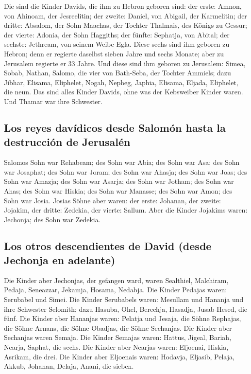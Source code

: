  Die sind die Kinder Davids, die ihm zu Hebron geboren
sind: der erste: Amnon, von Ahinoam, der Jesreelitin; der zweite:
Daniel, von Abigail, der Karmelitin;  der dritte: Absalom,
der Sohn Maachas, der Tochter Thalmais, des Königs zu Gessur; der
vierte: Adonia, der Sohn Haggiths;  der fünfte: Sephatja,
von Abital; der sechste: Jethream, von seinem Weibe Egla. 
Diese sechs sind ihm geboren zu Hebron; denn er regierte daselbst sieben
Jahre und sechs Monate; aber zu Jerusalem regierte er 33 Jahre.
 Und diese sind ihm geboren zu Jerusalem: Simea, Sobab,
Nathan, Salomo, die vier von Bath-Seba, der Tochter Ammiels;
 dazu Jibhar, Elisama, Eliphelet,  Nogah,
Nepheg, Japhia,  Elisama, Eljada, Eliphelet, die neun.
 Das sind alles Kinder Davids, ohne was der Kebsweiber
Kinder waren. Und Thamar war ihre Schwester.

\hypertarget{los-reyes-davuxeddicos-desde-salomuxf3n-hasta-la-destrucciuxf3n-de-jerusaluxe9n}{%
\subsection{Los reyes davídicos desde Salomón hasta la destrucción de
Jerusalén}\label{los-reyes-davuxeddicos-desde-salomuxf3n-hasta-la-destrucciuxf3n-de-jerusaluxe9n}}

 Salomos Sohn war Rehabeam; des Sohn war Abia; des Sohn
war Asa; des Sohn war Josaphat;  des Sohn war Joram; des
Sohn war Ahasja; des Sohn war Joas;  des Sohn war Amazja;
des Sohn war Asarja; des Sohn war Jotham;  des Sohn war
Ahas; des Sohn war Hiskia; des Sohn war Manasse;  des
Sohn war Amon; des Sohn war Josia.  Josias Söhne aber
waren: der erste: Johanan, der zweite: Jojakim, der dritte: Zedekia, der
vierte: Sallum.  Aber die Kinder Jojakims waren:
Jechonja; des Sohn war Zedekia.

\hypertarget{los-otros-descendientes-de-david-desde-jechonja-en-adelante}{%
\subsection{Los otros descendientes de David (desde Jechonja en
adelante)}\label{los-otros-descendientes-de-david-desde-jechonja-en-adelante}}

 Die Kinder aber Jechonjas, der gefangen ward, waren
Sealthiel,  Malchiram, Pedaja, Seneazzar, Jekamja,
Hosama, Nedabja.  Die Kinder Pedajas waren: Serubabel und
Simei. Die Kinder Serubabels waren: Mesullam und Hananja und ihre
Schwester Selomith;  dazu Hasuba, Ohel, Berechja,
Hasadja, Jusab-Hesed, die fünf.  Die Kinder aber Hananjas
waren: Pelatja und Jesaja, die Söhne Rephajas, die Söhne Arnans, die
Söhne Obadjas, die Söhne Sechanjas.  Die Kinder aber
Sechanjas waren Semaja. Die Kinder Semajas waren: Hattus, Jigeal,
Bariah, Nearja, Saphat, die sechs.  Die Kinder aber
Nearjas waren: Eljoenai, Hiskia, Asrikam, die drei.  Die
Kinder aber Eljoenais waren: Hodavja, Eljasib, Pelaja, Akkub, Johanan,
Delaja, Anani, die sieben.

